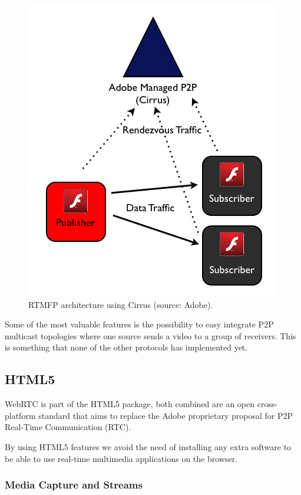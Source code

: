  \begin{figure}[h]
  \centering
    \includegraphics[scale=0.6]{./figures/cirrusAdobe.jpg}
      \caption[RTMFP architecture using Cirrus (source: Adobe)]{RTMFP architecture using Cirrus (source: Adobe).}
	\label{fig:RTMFParchitecture}
\end{figure}
 
Some of the most valuable features is the possibility to easy integrate P2P multicast topologies where one source sends a video to a group of receivers. This is something that none of the other protocols has implemented yet.

\subsection{HTML5}

WebRTC is part of the HTML5 package, both combined are an open cross-platform standard that aims to replace the Adobe proprietary proposal for P2P Real-Time Communication (RTC).

By using HTML5 features we avoid the need of installing any extra software to be able to use real-time multimedia applications on the browser.

\subsubsection{Media Capture and Streams}

